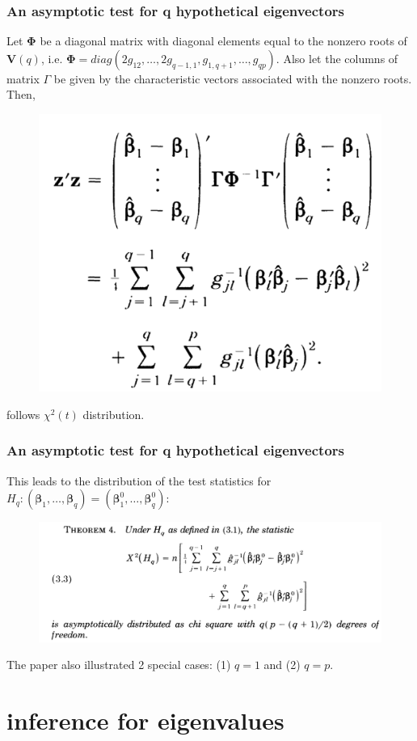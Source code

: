 \documentclass{beamer}
\begin{document}
	\begin{frame}
		\frametitle{An asymptotic test for q hypothetical eigenvectors}
		Let $\bm{\Phi} $ be a diagonal matrix with diagonal elements equal to the nonzero roots of $\bm{V}(q)$, i.e. $\bm{\Phi} = diag(2g_{12},\ldots,2g_{q-1,1},g_{1,q+1},\ldots,g_{qp})$. Also let the columns of matrix $\Gamma$ be given by the characteristic vectors associated with the nonzero roots. Then, 
		\begin{figure}
			\includegraphics[width=0.5\linewidth]{image011.png}
		\end{figure}
		follows $\chi^2(t)$ distribution.
	\end{frame}
	
	\begin{frame}
		\frametitle{An asymptotic test for q hypothetical eigenvectors}
		This leads to the distribution of the test statistics for  $H_q: (\bm{\beta}_1,\ldots,\bm{\beta}_q) = (\bm{\beta}_1^0,\ldots,\bm{\beta}_q^0)$:
		\begin{figure}
			\includegraphics[width=.9\linewidth]{image012.png}
		\end{figure}
		The paper also illustrated 2 special cases: (1) $q=1$ and (2) $q = p$.
	\end{frame}
	
	\section{inference for eigenvalues}
	
\end{document}
